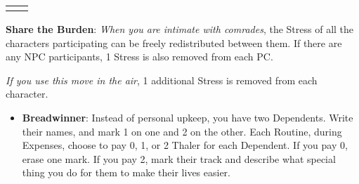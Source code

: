 \documentclass[twoside,headings,a4paper]{article}
\begin{document}
{\begin{NiceTabular}[rules/width=0.5mm]{X|X}
{            
        }
    \end{NiceTabular}
    \PlaybookRuleL

    \textbf{Share the Burden}: \textit{When you are intimate with comrades}, the Stress of all the characters
    participating can be freely redistributed between them. If there are any NPC participants, 1
    Stress is also removed from each PC.

    \textit{If you use this move in the air}, 1 additional Stress is removed from each character.
    \vfill

    \columnbreak
    \begin{itemize}
        \renewcommand{\labelitemi}{{\LARGE\bullet}}
        \item \textbf{Breadwinner}: Instead of personal upkeep, you have two Dependents. Write their names,
              and mark 1 on one and 2 on the other. Each Routine, during Expenses, choose to pay 0,
              1, or 2 Thaler for each Dependent. If you pay 0, erase one mark. If you pay 2, mark their
              track and describe what special thing you do for them to make their lives easier.


\end{itemize}}
\end{document}
